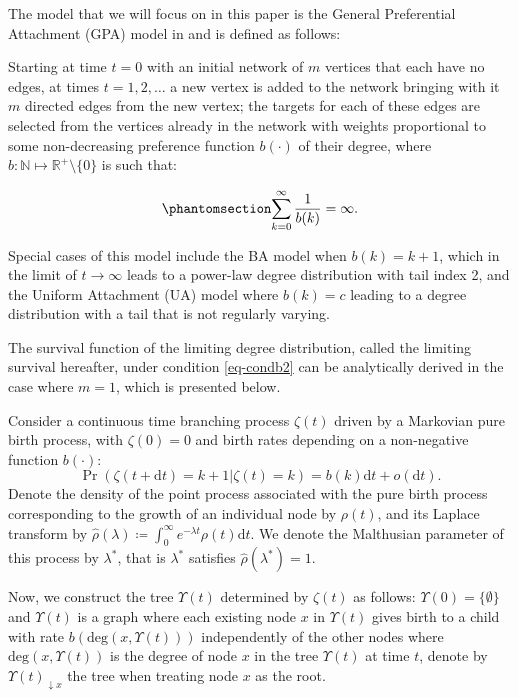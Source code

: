 \documentclass[
  sn-basic,
  10pt,
]{sn-jnl}
\theoremstyle{thmstyleone}
\theoremstyle{thmstyleone}
\theoremstyle{remark}
\theoremstyle{plain}
\theoremstyle{plain}
\theoremstyle{remark}
\begin{document}
The model that we will focus on in this paper is the General
Preferential Attachment (GPA) model in \citet{rudas07} and is defined as
follows:

Starting at time \(t=0\) with an initial network of \(m\) vertices that
each have no edges, at times \(t=1,2,\ldots\) a new vertex is added to
the network bringing with it \(m\) directed edges from the new vertex;
the targets for each of these edges are selected from the vertices
already in the network with weights proportional to some non-decreasing
preference function \(b(\cdot)\) of their degree, where
\(b: \mathbb N \mapsto \mathbb R^+\setminus\{0\}\) is such that:

\begin{equation}\phantomsection\label{eq-condb2}{
\sum_{k=0}^\infty\frac{1}{b(k)} = \infty.
}\end{equation}

Special cases of this model include the BA model when $b(k) = k+1$, which in the limit of $t\rightarrow \infty$ leads to a power-law degree distribution with tail index 2, and the Uniform Attachment (UA) model where $b(k)=c$ leading to a degree distribution with a tail that is not regularly varying.

The survival function of the limiting degree distribution, called the
limiting survival hereafter, under condition \ref{eq-condb2} can be
analytically derived in the case where \(m=1\), which is presented
below.

Consider a continuous time branching process \(\zeta(t)\) driven by a
Markovian pure birth process, with \(\zeta(0)=0\) and birth rates
depending on a non-negative function \(b(\cdot)\): \[
\Pr(\zeta(t+\text{d}t)=k+1|\zeta(t)=k) = b(k)\text{d}t + o(\text{d}t).
\] Denote the density of the point process associated with the pure
birth process corresponding to the growth of an individual node by
\(\rho(t)\), and its Laplace transform by
\(\hat \rho(\lambda)\coloneq \int_0^\infty e^{-\lambda t}\rho(t)\text{d}t\).
We denote the Malthusian parameter of this process by \(\lambda^*\),
that is \(\lambda^*\) satisfies \(\hat\rho(\lambda^*) = 1\).

Now, we construct the tree \(\Upsilon(t)\) determined by \(\zeta(t)\) as
follows: \(\Upsilon(0)=\{\emptyset\}\) and \(\Upsilon(t)\) is a graph
where each existing node \(x\) in \(\Upsilon(t)\) gives birth to a child
with rate \(b(\mathrm{deg}(x, \Upsilon(t)))\) independently of the other
nodes where \(\mathrm{deg}(x, \Upsilon(t))\) is the degree of node \(x\)
in the tree \(\Upsilon(t)\) at time \(t\), denote by
\(\Upsilon(t)_{\downarrow x}\) the tree when treating node \(x\) as the
root.
\end{document}
